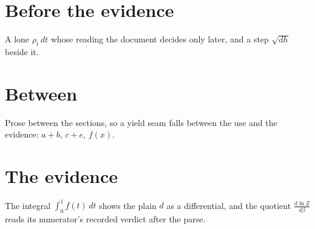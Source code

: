 \documentclass{article}
\begin{document}
\section{Before the evidence}

A lone $\rho_t\,dt$ whose reading the document decides only later, and a
step $\sqrt{dh}$ beside it.

\section{Between}

Prose between the sections, so a yield seam falls between the use and the
evidence: $a+b$, $c+e$, $f(x)$.

\section{The evidence}

The integral $\int_0^1 f(t)\,dt$ shows the plain $d$ as a differential, and the quotient
$\frac{d\ln Z}{d\beta}$ reads its numerator's recorded verdict after the parse.
\end{document}
